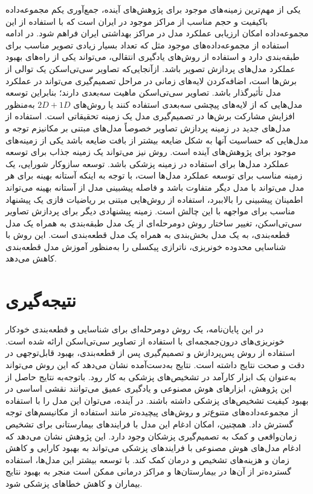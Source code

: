 یکی از مهم‌ترین زمینه‌های موجود برای پژوهش‌های آینده، جمع‌آوری یکم مجموعه‌داده باکیفیت و حجم مناسب از مراکز موجود در ایران است که با استفاده از این مجموعه‌داده امکان ارزیابی عملکرد مدل در مراکز بهداشتی ایران فراهم شود. در ادامه استفاده از مجموعه‌داده‌های موجود مثل
\cite{rsna_hemorrhage_detection_kaggle}
که تعداد بسیار زیادی تصویر مناسب برای طبقه‌بندی دارد و استفاده از روش‌های یادگیری انتقالی،‌ می‌تواند یکی از راه‌های بهبود عملکرد مدل‌های پردازش تصویر باشد. 
ازآنجایی‌که تصاویر سی‌تی‌اسکن یک توالی از برش‌ها است، اضافه‌کردن لایه‌های زمانی در مراحل تصمیم‌گیری می‌تواند در عملکرد مدل تأثیرگذار باشد. تصاویر سی‌تی‌اسکن ماهیت سه‌بعدی دارند؛ بنابراین توسعه مدل‌هایی که از لایه‌های پیچشی سه‌بعدی استفاده کنند یا روش‌های 
$2D+1D$
به‌منظور افزایش مشارکت برش‌ها در تصمیم‌گیری مدل یک زمینه تحقیقاتی است.
استفاده از مدل‌های جدید در زمینه پردازش تصاویر خصوصاً مدل‌های مبتنی بر مکانیزم 
توجه و مدل‌هایی که حساسیت آنها به شکل ضایعه بیشتر از بافت ضایعه باشد یکی از زمینه‌های موجود برای پژوهش‌های آینده است.
روش 
نیز می‌تواند یک زمینه جذاب برای توسعه عملکرد مدل‌ها برای استفاده در زمینه پزشکی باشد. 
توسعه سازوکار شورایی،‌ یک زمینه مناسب برای توسعه عملکرد مدل‌ها است،‌ با توجه به اینکه آستانه بهینه برای هر مدل می‌تواند با مدل دیگر متفاوت باشد و فاصله پیشبینی مدل از آستانه بهینه می‌تواند اطمینان پیشبینی را بالاببرد،‌ استفاده از روش‌هایی مبتنی بر ریاضیات فازی 
یک پیشنهاد مناسب برای مواجهه با این چالش است. زمینه پیشنهادی دیگر برای پردازش تصاویر سی‌تی‌اسکن، تغییر ساختار روش دومرحله‌ای از یک مدل طبقه‌بندی به همراه یک مدل قطعه‌بندی، به یک مدل بخش‌بندی به همراه یک مدل قطعه‌بندی است. این روش با شناسایی محدوده خونریزی، ناترازی پیکسلی را به‌منظور آموزش مدل قطعه‌بندی کاهش می‌دهد. 
 
\section{نتیجه‌گیری}
در این پایان‌نامه، یک روش دومرحله‌ای برای شناسایی و قطعه‌بندی خودکار خونریزی‌های درون‌جمجمه‌ای با استفاده از تصاویر سی‌تی‌اسکن ارائه شده است. استفاده از روش پس‌پردازش و تصمیم‌گیری پس از قطعه‌بندی، بهبود قابل‌توجهی در دقت و صحت نتایج داشته است. نتایج به‌دست‌آمده نشان می‌دهد که این روش می‌تواند به‌عنوان یک ابزار کارآمد در تشخیص‌های پزشکی به کار رود.
باتوجه‌به نتایج حاصل از این پژوهش، ابزار‌های هوش مصنوعی و یادگیری عمیق می‌توانند نقشی اساسی در بهبود کیفیت تشخیص‌های پزشکی داشته باشند. در آینده، می‌توان این مدل را با استفاده از مجموعه‌داده‌های متنوع‌تر و روش‌های پیچیده‌تر مانند استفاده از مکانیسم‌های توجه گسترش داد. همچنین، امکان ادغام این مدل با فرایند‌های بیمارستانی برای تشخیص زمان‌واقعی و کمک به تصمیم‌گیری پزشکان وجود دارد.
این پژوهش نشان می‌دهد که ادغام مدل‌های هوش مصنوعی با فرایند‌های پزشکی می‌تواند به بهبود کارایی و کاهش زمان و هزینه‌های تشخیص و درمان کمک کند. با توسعه بیشتر این مدل‌ها، استفاده گسترده‌تر از آن‌ها در بیمارستان‌ها و مراکز درمانی ممکن است منجر به بهبود نتایج بیماران و کاهش خطاهای پزشکی شود.
